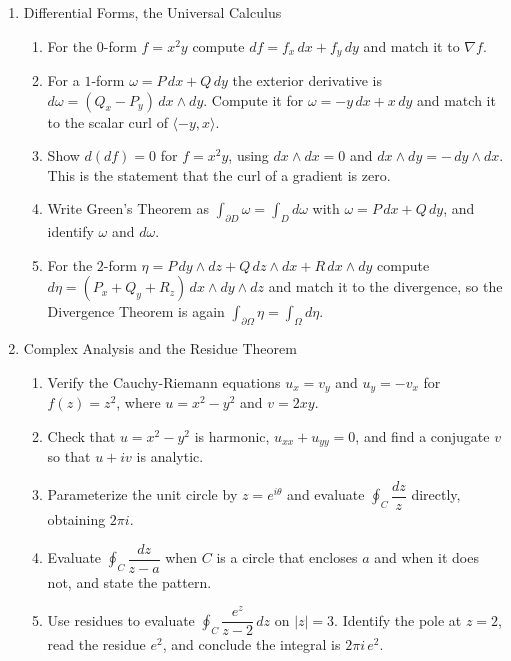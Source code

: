 \documentclass[12pt]{article}
\begin{document}
\begin{enumerate}
\item Differential Forms, the Universal Calculus
    \begin{enumerate}
        \item For the $0$-form $f=x^2 y$ compute $df=f_x\,dx+f_y\,dy$ and match it to $\nabla f$.
        \item For a $1$-form $\omega=P\,dx+Q\,dy$ the exterior derivative is $d\omega=(Q_x-P_y)\,dx\wedge dy$. Compute it for $\omega=-y\,dx+x\,dy$ and match it to the scalar curl of $\langle -y,x\rangle$.
        \item Show $d(df)=0$ for $f=x^2 y$, using $dx\wedge dx=0$ and $dx\wedge dy=-\,dy\wedge dx$. This is the statement that the curl of a gradient is zero.
        \item Write Green's Theorem as $\int_{\partial D}\omega=\int_D d\omega$ with $\omega=P\,dx+Q\,dy$, and identify $\omega$ and $d\omega$.
        \item For the $2$-form $\eta=P\,dy\wedge dz+Q\,dz\wedge dx+R\,dx\wedge dy$ compute $d\eta=(P_x+Q_y+R_z)\,dx\wedge dy\wedge dz$ and match it to the divergence, so the Divergence Theorem is again $\int_{\partial\Omega}\eta=\int_\Omega d\eta$.
    \end{enumerate}
\newpage

\item Complex Analysis and the Residue Theorem
    \begin{enumerate}
        \item Verify the Cauchy-Riemann equations $u_x=v_y$ and $u_y=-v_x$ for $f(z)=z^2$, where $u=x^2-y^2$ and $v=2xy$.
        \item Check that $u=x^2-y^2$ is harmonic, $u_{xx}+u_{yy}=0$, and find a conjugate $v$ so that $u+iv$ is analytic.
        \item Parameterize the unit circle by $z=e^{i\theta}$ and evaluate $\oint_C \dfrac{dz}{z}$ directly, obtaining $2\pi i$.
        \item Evaluate $\oint_C \dfrac{dz}{z-a}$ when $C$ is a circle that encloses $a$ and when it does not, and state the pattern.
        \item Use residues to evaluate $\oint_C \dfrac{e^z}{z-2}\,dz$ on $|z|=3$. Identify the pole at $z=2$, read the residue $e^2$, and conclude the integral is $2\pi i\,e^2$.
    \end{enumerate}
\bigskip


\end{enumerate}
\end{document}
